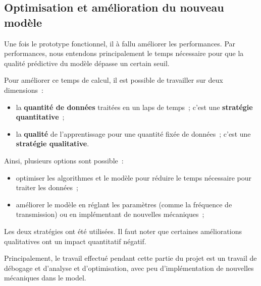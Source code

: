 \subsection{Optimisation et amélioration du nouveau modèle}


Une fois le prototype fonctionnel, il à fallu améliorer les performances.
Par performances, nous entendons principalement le temps nécessaire pour que la qualité prédictive du modèle dépasse un certain seuil.

Pour améliorer ce temps de calcul, il est possible de travailler sur deux dimensions~:
\begin{itemize}
	\item la \textbf{quantité de données} traitées en un laps de temps~; c'est une \textbf{stratégie quantitative}~;
	\item la \textbf{qualité} de l'apprentissage pour une quantité fixée de données~; c'est une \textbf{stratégie qualitative}.
\end{itemize}

Ainsi, plusieurs options sont possible~:
\begin{itemize}
	\item optimiser les algorithmes et le modèle pour réduire le temps nécessaire pour traiter les données~;
	\item améliorer le modèle en réglant les paramètres (comme la fréquence de transmission) ou en implémentant de nouvelles mécaniques~;
\end{itemize}
\hspace{1em}

Les deux stratégies ont été utilisées. Il faut noter que certaines améliorations qualitatives ont un impact quantitatif négatif.

Principalement, le travail effectué pendant cette partie du projet est un travail de débogage et d'analyse et d'optimisation, avec peu d'implémentation de nouvelles mécaniques dans le \gls{model}.


